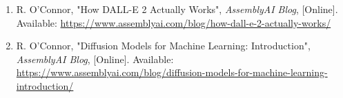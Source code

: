 \documentclass{article}
\begin{document}
\begin{enumerate}
			\item R. O'Connor, "How DALL-E 2 Actually Works", \textit{AssemblyAI Blog}, [Online]. Available: \url{https://www.assemblyai.com/blog/how-dall-e-2-actually-works/}
			
			\item R. O'Connor, "Diffusion Models for Machine Learning: Introduction", \textit{AssemblyAI Blog}, [Online]. Available: \url{https://www.assemblyai.com/blog/diffusion-models-for-machine-learning-introduction/}
		\end{enumerate}
		
		
		
		
		
	
\end{document}
